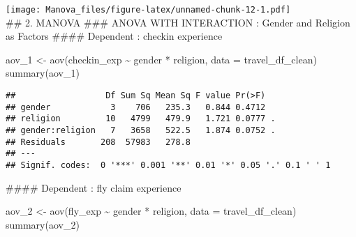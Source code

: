 \documentclass[
]{article}
\newenvironment{Shaded}{\begin{snugshade}}{\end{snugshade}}
\newcommand{\AttributeTok}[1]{\textcolor[rgb]{0.77,0.63,0.00}{#1}}
\newcommand{\DecValTok}[1]{\textcolor[rgb]{0.00,0.00,0.81}{#1}}
\newcommand{\FunctionTok}[1]{\textcolor[rgb]{0.00,0.00,0.00}{#1}}
\newcommand{\NormalTok}[1]{#1}
\newcommand{\OtherTok}[1]{\textcolor[rgb]{0.56,0.35,0.01}{#1}}
\newcommand{\SpecialCharTok}[1]{\textcolor[rgb]{0.00,0.00,0.00}{#1}}
\newcommand{\StringTok}[1]{\textcolor[rgb]{0.31,0.60,0.02}{#1}}
\begin{document}
\begin{Shaded}
\end{Shaded}

\texttt{[image: Manova\_files/figure-latex/unnamed-chunk-12-1.pdf]}\\
\#\# 2. MANOVA \#\#\# ANOVA WITH INTERACTION : Gender and Religion as
Factors \#\#\#\# Dependent : checkin experience

\begin{Shaded}
\begin{Highlighting}[]
\NormalTok{aov\_1 }\OtherTok{\textless{}{-}} \FunctionTok{aov}\NormalTok{(checkin\_exp }\SpecialCharTok{\textasciitilde{}}\NormalTok{ gender }\SpecialCharTok{*}\NormalTok{ religion, }\AttributeTok{data =}\NormalTok{ travel\_df\_clean)}
\FunctionTok{summary}\NormalTok{(aov\_1)}
\end{Highlighting}
\end{Shaded}

\begin{verbatim}
##                  Df Sum Sq Mean Sq F value Pr(>F)  
## gender            3    706   235.3   0.844 0.4712  
## religion         10   4799   479.9   1.721 0.0777 .
## gender:religion   7   3658   522.5   1.874 0.0752 .
## Residuals       208  57983   278.8                 
## ---
## Signif. codes:  0 '***' 0.001 '**' 0.01 '*' 0.05 '.' 0.1 ' ' 1
\end{verbatim}

\hfill\break
\#\#\#\# Dependent : fly claim experience

\begin{Shaded}
\begin{Highlighting}[]
\NormalTok{aov\_2 }\OtherTok{\textless{}{-}} \FunctionTok{aov}\NormalTok{(fly\_exp }\SpecialCharTok{\textasciitilde{}}\NormalTok{ gender }\SpecialCharTok{*}\NormalTok{ religion, }\AttributeTok{data =}\NormalTok{ travel\_df\_clean)}
\FunctionTok{summary}\NormalTok{(aov\_2)}
\end{Highlighting}
\end{Shaded}
\end{document}

